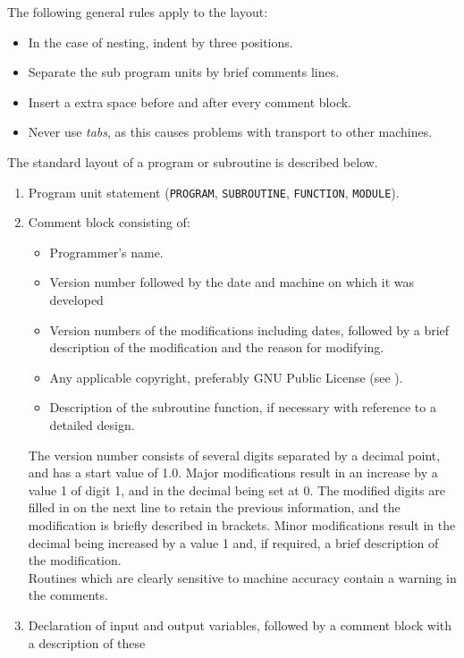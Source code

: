 \documentclass[12pt]{book}
\newcommand{\hl}[1]{\htmladdnormallink{{\it #1}}{#1}}
\begin{document}
The following general rules apply to the layout:
\begin{itemize}
  \item In the case of nesting, indent by three positions.
  \item Separate the sub program units by brief comments lines.
  \item Insert a extra space before and after every comment block.
  \item Never use {\em tabs}, as this causes problems with transport to other machines.
\end{itemize}
The standard layout of a program or subroutine is described below.
\begin{enumerate}
  \item Program unit statement ({\tt PROGRAM}, {\tt SUBROUTINE}, {\tt FUNCTION}, {\tt MODULE}).
  \item Comment block consisting of:
        \begin{itemize}
          \item Programmer's name.
          \item Version number followed by the date and machine on which it was developed
          \item Version numbers of the modifications including dates, followed by a brief description of the
                modification and the reason for modifying.
          \item Any applicable copyright, preferably GNU Public License (see \hl{http://www.gnu.org}).
          \item Description of the subroutine function, if necessary with reference to a detailed design.
        \end{itemize}
        The version number consists of several digits separated by a decimal point, and has a start value of
        1.0. Major modifications result in an increase by a value 1 of digit 1, and in the decimal being set at 0.
        The modified digits are filled in on the next line to retain the previous information, and the
        modification is briefly described in brackets. Minor modifications result in the decimal being increased
        by a value 1 and, if required, a brief description of the modification.
        \\[2ex]
        \noindent
        Routines which are clearly sensitive to machine accuracy contain a warning in the comments.
  \item Declaration of input and output variables, followed by a comment block with a description of these

\end{enumerate}
\end{document}
